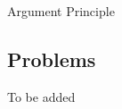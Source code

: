 \vspace*{1em}

\begin{mdframed}
\begin{center}
{\Large Argument Principle}
\end{center}
\end{mdframed}

\begin{definition}

\end{definition}

\vspace*{2em}

\subsection{Problems}
\vspace{0.1in}
To be added
%
